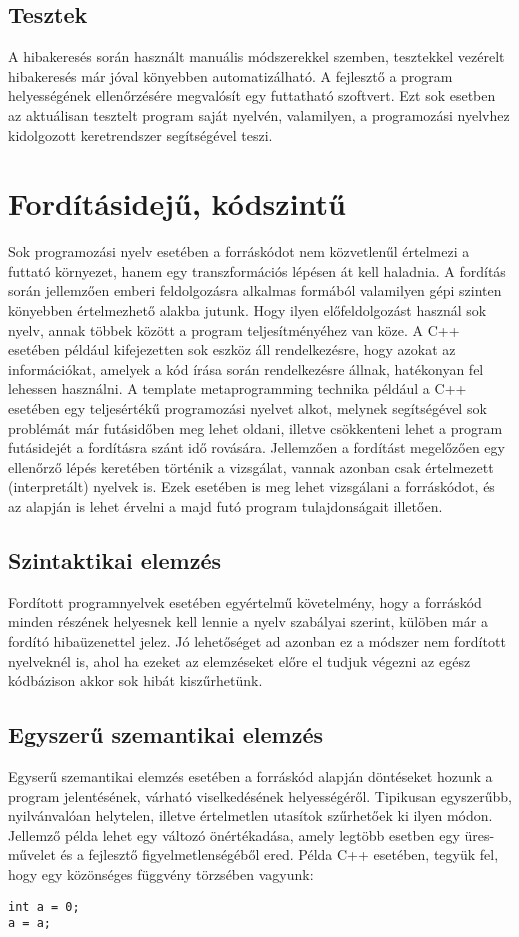 \documentclass[a4paper,12pt]{report}
\begin{document}
\subsection{Tesztek}
A hibakeresés során használt manuális módszerekkel szemben, tesztekkel vezérelt hibakeresés már jóval könyebben automatizálható. A fejlesztő a program helyességének ellenőrzésére megvalósít egy futtatható szoftvert. Ezt sok esetben az aktuálisan tesztelt program saját nyelvén, valamilyen, a programozási nyelvhez kidolgozott keretrendszer segítségével teszi. 
\section{Fordításidejű, kódszintű}
Sok programozási nyelv esetében a forráskódot nem közvetlenűl értelmezi a futtató környezet, hanem egy transzformációs lépésen át kell haladnia. A fordítás során jellemzően emberi feldolgozásra alkalmas formából valamilyen gépi szinten könyebben értelmezhető alakba jutunk. Hogy ilyen előfeldolgozást használ sok nyelv, annak többek között a program teljesítményéhez van köze. A C++ esetében például kifejezetten sok eszköz áll rendelkezésre, hogy azokat az információkat, amelyek a kód írása során rendelkezésre állnak, hatékonyan fel lehessen használni. A template metaprogramming technika például a C++ esetében egy teljesértékű programozási nyelvet alkot, melynek segítségével sok problémát már futásidőben meg lehet oldani, illetve csökkenteni lehet a program futásidejét a fordításra szánt idő rovására.
Jellemzően a fordítást megelőzően egy ellenőrző lépés keretében történik a vizsgálat, vannak azonban csak értelmezett (interpretált) nyelvek is. Ezek esetében is meg lehet vizsgálani a forráskódot, és az alapján is lehet érvelni a majd futó program tulajdonságait illetően.
\subsection{Szintaktikai elemzés}
Fordított programnyelvek esetében egyértelmű követelmény, hogy a forráskód minden részének helyesnek kell lennie a nyelv szabályai szerint, külöben már a fordító hibaüzenettel jelez. Jó lehetőséget ad azonban ez a módszer nem fordított nyelveknél is, ahol ha ezeket az elemzéseket előre el tudjuk végezni az egész kódbázison akkor sok hibát kiszűrhetünk.
\subsection{Egyszerű szemantikai elemzés}
Egyserű szemantikai elemzés esetében a forráskód alapján döntéseket hozunk a program jelentésének, várható viselkedésének helyességéről. Tipikusan egyszerűbb, nyilvánvalóan helytelen, illetve értelmetlen utasítok szűrhetőek ki ilyen módon. Jellemző példa lehet egy változó önértékadása, amely legtöbb esetben egy üres-művelet és a fejlesztő figyelmetlenségéből ered.
Példa C++ esetében, tegyük fel, hogy egy közönséges függvény törzsében vagyunk:
\begin{lstlisting}
int a = 0;
a = a;
\end{lstlisting}
\end{document}
